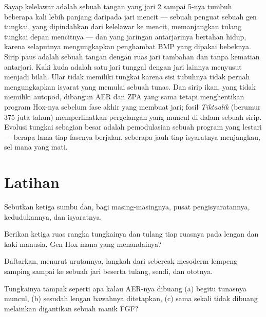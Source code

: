 \begin{example}\label{ex:b2:limb-organogenesis:evolution}
Sayap kelelawar adalah sebuah tangan yang jari 2 sampai 5-nya tumbuh
beberapa kali lebih panjang daripada jari mencit --- sebuah penguat
sebuah gen tungkai, yang dipindahkan dari kelelawar ke mencit,
memanjangkan tulang tungkai depan mencitnya --- dan yang jaringan
antarjarinya bertahan hidup, karena selaputnya mengungkapkan penghambat
BMP yang dipakai bebeknya. Sirip paus adalah sebuah tangan dengan ruas
jari tambahan dan tanpa kematian antarjari. Kaki kuda adalah satu jari
tunggal dengan jari lainnya menyusut menjadi bilah. Ular tidak memiliki
tungkai karena sisi tubuhnya tidak pernah mengungkapkan isyarat yang
memulai sebuah tunas. Dan sirip ikan, yang tidak memiliki autopod,
dibangun AER dan ZPA yang sama tetapi menghentikan program Hox-nya
sebelum fase akhir yang membuat jari; fosil \emph{Tiktaalik} (berumur
375 juta tahun) memperlihatkan pergelangan yang muncul di dalam sebuah
sirip. Evolusi tungkai sebagian besar adalah pemodulasian sebuah program
yang lestari --- berapa lama tiap fasenya berjalan, seberapa jauh tiap
isyaratnya menjangkau, sel mana yang mati.
\end{example}

\section{Latihan}

\begin{exercise}[$\star$]\label{exo:b2:limb-organogenesis:1}
Sebutkan ketiga sumbu  dan, bagi masing-masingnya,
pusat pengisyaratannya, kedudukannya, dan isyaratnya.
\end{exercise}

\begin{exercise}[$\star$]\label{exo:b2:limb-organogenesis:2}
Berikan ketiga ruas rangka tungkainya dan tulang tiap ruasnya pada
lengan dan kaki manusia. Gen Hox mana yang menandainya?
\end{exercise}

\begin{exercise}[$\star$]\label{exo:b2:limb-organogenesis:3}
Daftarkan, menurut urutannya, langkah dari sebercak mesoderm lempeng
samping sampai ke sebuah jari beserta tulang, sendi, dan ototnya.
\end{exercise}

\begin{exercise}[$\star$]\label{exo:b2:limb-organogenesis:4}
Tungkainya tampak seperti apa kalau AER-nya dibuang (a) begitu tunasnya
muncul, (b) sesudah lengan bawahnya ditetapkan, (c) sama sekali tidak
dibuang melainkan digantikan sebuah manik FGF?
\end{exercise}

